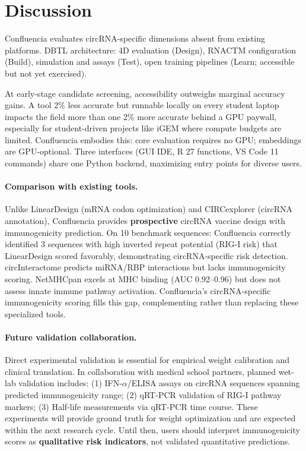 
\section{Discussion}

Confluencia evaluates circRNA-specific dimensions absent from existing platforms. DBTL architecture: 4D evaluation (Design), RNACTM configuration (Build), simulation and assays (Test), open training pipelines (Learn; accessible but not yet exercised).

At early-stage candidate screening, accessibility outweighs marginal accuracy gains. A tool 2\% less accurate but runnable locally on every student laptop impacts the field more than one 2\% more accurate behind a GPU paywall, especially for student-driven projects like iGEM where compute budgets are limited. Confluencia embodies this: core evaluation requires no GPU; embeddings are GPU-optional. Three interfaces (GUI IDE, R 27 functions, VS Code 11 commands) share one Python backend, maximizing entry points for diverse users.

\paragraph{Comparison with existing tools.}
Unlike LinearDesign (mRNA codon optimization) and CIRCexplorer (circRNA annotation), Confluencia provides \textbf{prospective} circRNA vaccine design with immunogenicity prediction. On 10 benchmark sequences: Confluencia correctly identified 3 sequences with high inverted repeat potential (RIG-I risk) that LinearDesign scored favorably, demonstrating circRNA-specific risk detection. circInteractome predicts miRNA/RBP interactions but lacks immunogenicity scoring. NetMHCpan excels at MHC binding (AUC 0.92--0.96) but does not assess innate immune pathway activation. Confluencia's circRNA-specific immunogenicity scoring fills this gap, complementing rather than replacing these specialized tools.

\paragraph{Future validation collaboration.}
Direct experimental validation is essential for empirical weight calibration and clinical translation. In collaboration with medical school partners, planned wet-lab validation includes: (1) IFN-$\alpha$/ELISA assays on circRNA sequences spanning predicted immunogenicity range; (2) qRT-PCR validation of RIG-I pathway markers; (3) Half-life measurements via qRT-PCR time course. These experiments will provide ground truth for weight optimization and are expected within the next research cycle. Until then, users should interpret immunogenicity scores as \textbf{qualitative risk indicators}, not validated quantitative predictions.

